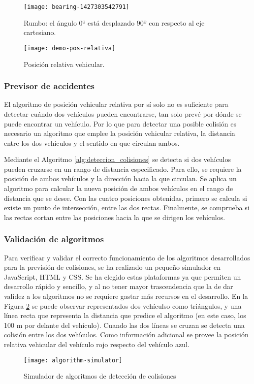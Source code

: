 \begin{figure}[h]
	\begin{center}
		\texttt{[image: bearing-1427303542791]}
		\caption{Rumbo: el ángulo 0º está desplazado 90º con respecto al eje cartesiano.}
		\label{fig:rumbo_gps}
	\end{center}
	\begin{center}
		\texttt{[image: demo-pos-relativa]}
		\caption{Posición relativa vehicular.}
		\label{fig:demo_pos_relativa}
	\end{center}
\end{figure}

\FloatBarrier
\subsubsection{Previsor de accidentes}
El algoritmo de posición vehicular relativa por sí solo no es suficiente para
detectar cuándo dos vehículos pueden encontrarse, tan solo prevé por dónde se
puede encontrar un vehículo. Por lo que para detectar una posible colisión es
necesario un algoritmo que emplee la posición vehicular relativa, la distancia
entre los dos vehículos y el sentido en que circulan ambos.

Mediante el Algoritmo \ref{alg:deteccion_colisiones} se detecta si dos
vehículos pueden cruzarse en un rango de distancia especificado. Para ello,
se requiere la posición de ambos vehículos y la dirección hacia la que
circulan. Se aplica un algoritmo para calcular la nueva posición de ambos
vehículos en el rango de distancia que se desee. Con las cuatro posiciones
obtenidas, primero se calcula si existe un punto de intersección, entre las
dos rectas. Finalmente, se comprueba si las rectas cortan entre las posiciones
hacia la que se dirigen los vehículos.

\subsubsection{Validación de algoritmos}
Para verificar y validar el correcto funcionamiento de los algoritmos
desarrollados para la previsión de colisiones, se ha realizado un pequeño
simulador en JavaScript, HTML y CSS. Se ha elegido estas plataformas ya que
permiten un desarrollo rápido y sencillo, y al no tener mayor trascendencia que
la de dar validez a los algoritmos no se requiere gastar más recursos en el
desarrollo. En la Figura \ref{fig:simulador-algoritmos} se puede observar
representados dos vehículso como triángulos, y una línea recta que representa
la distancia que predice el algoritmo (en este caso, los 100 m por delante
del vehículo). Cuando las dos líneas se cruzan se detecta una colisión entre
los dos vehículos. Como información adicional se provee la posición relativa
vehicular del vehículo rojo respecto del vehículo azul.

\begin{figure}[h]
	\begin{center}
		\texttt{[image: algorithm-simulator]}
		\caption{Simulador de algoritmos de detección de colisiones}
		\label{fig:simulador-algoritmos}
	\end{center}
\end{figure}
